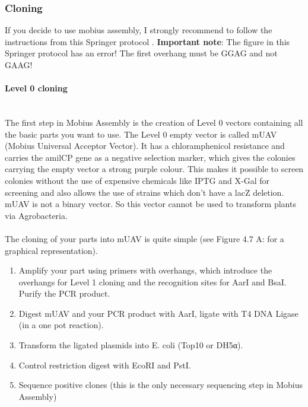 \subsubsection{Cloning}
If you decide to use mobius assembly, I strongly recommend to follow the instructions from this Springer protocol \parencite{Andreou2020}. \textbf{Important note}: The figure in this Springer protocol has an error! The first overhang must be GGAG and not GAAG!
\paragraph{Level 0 cloning} \mbox{}\\
The first step in Mobius Assembly is the creation of Level 0 vectors containing all the basic parts you want to use. The Level 0 empty vector is called mUAV (Mobius Universal Acceptor Vector). It has a chloramphenicol resistance and carries the amilCP gene as a negative selection marker, which gives the colonies carrying the empty vector a strong purple colour. This makes it possible to screen colonies without the use of expensive chemicals like IPTG and X-Gal for screening and also allows the use of strains which don’t have a lacZ deletion. mUAV is not a binary vector. So this vector cannot be used to transform plants via Agrobacteria.\\ \\
The cloning of your parts into mUAV is quite simple (see Figure 4.7 A: for a graphical representation).
\begin{enumerate}
\item Amplify your part using primers with overhangs, which introduce the overhangs for Level 1 cloning and the recognition sites for AarI and BsaI. Purify the PCR product.
\item Digest mUAV and your PCR product with AarI, ligate with T4 DNA Ligase (in a one pot reaction).
\item Transform the ligated plasmids into E. coli (Top10 or DH5α).
\item Control restriction digest with EcoRI and PstI.
\item Sequence positive clones (this is the only necessary sequencing step in Mobius Assembly)
\end{enumerate}

